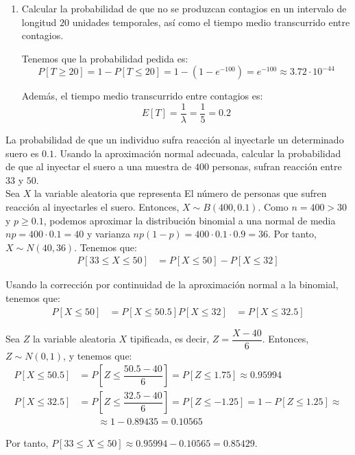 \begin{ejercicio}
\begin{enumerate}
        \item Calcular la probabilidad de que no se produzcan contagios en un intervalo de longitud $20$ unidades temporales, así como
        el tiempo medio transcurrido entre contagios.

        Tenemos que la probabilidad pedida es: $$P[T\geq 20] = 1-P[T\leq 20] = 1-(1-e^{-100}) = e^{-100} \approx 3.72\cdot 10^{-44}$$

        Además, el tiempo medio transcurrido entre contagios es:
        \begin{equation*}
            E[T] = \dfrac{1}{\lambda} = \dfrac{1}{5} = 0.2
        \end{equation*}


    \end{enumerate}
\end{ejercicio}

\begin{ejercicio}
    La probabilidad de que un individuo sufra reacción al inyectarle un determinado suero es $0.1$. Usando la aproximación normal adecuada, calcular la probabilidad de que al inyectar el suero a una muestra de $400$ personas, sufran reacción entre $33$ y $50$.\\

    Sea $X$ la variable aleatoria que representa El número de personas que sufren reacción al inyectarles el suero. Entonces, $X\sim B(400,0.1)$.
    Como $n=400>30$ y $p\geq 0.1$, podemos aproximar la distribución binomial a una normal de media $np = 400\cdot 0.1 = 40$ y varianza $np(1-p) = 400\cdot 0.1\cdot 0.9 = 36$. Por tanto, $X\sim N(40,36)$.
    Tenemos que:
    \begin{align*}
        P[33\leq X\leq 50] &= P\left[X\leq 50\right] - P\left[X\leq 32\right]
    \end{align*}

    Usando la corrección por continuidad de la aproximación normal a la binomial, tenemos que:
    \begin{align*}
        P\left[X\leq 50\right] &= P\left[X\leq 50.5\right]
        P\left[X\leq 32\right] &= P\left[X\leq 32.5\right]
    \end{align*}

    Sea $Z$ la variable aleatoria $X$ tipificada, es decir, $Z = \dfrac{X-40}{6}$. Entonces, $Z\sim N(0,1)$, y tenemos que:
    \begin{align*}
        P\left[X\leq 50.5\right] &= P\left[Z\leq \dfrac{50.5-40}{6}\right] = P\left[Z\leq 1.75\right] \approx 0.95994\\
        P\left[X\leq 32.5\right] &= P\left[Z\leq \dfrac{32.5-40}{6}\right] = P\left[Z\leq -1.25\right]
        = 1-P\left[Z\leq 1.25\right] \approx \\&\qquad \approx 1-0.89435 = 0.10565
    \end{align*}

    Por tanto, $P[33\leq X\leq 50] \approx 0.95994-0.10565 = 0.85429$.
\end{ejercicio}

